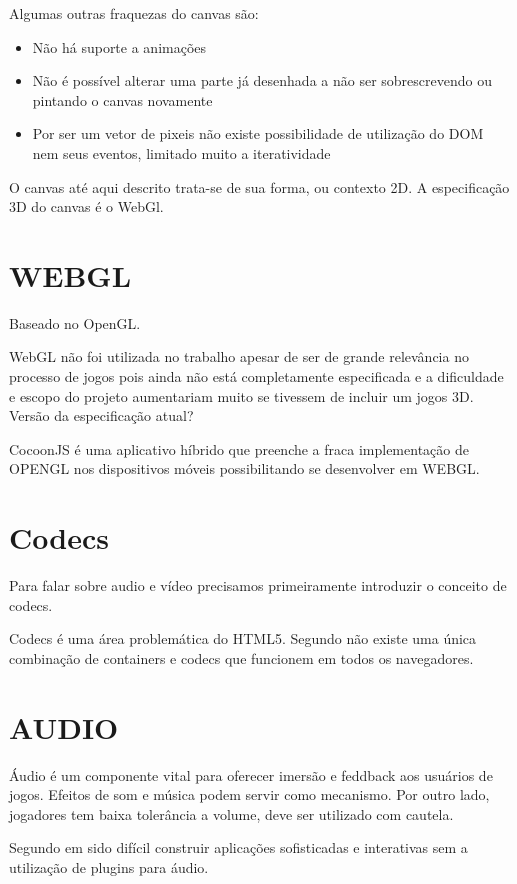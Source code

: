 \documentclass[
12pt,
a4paper,
portuges,
draft
]{report}
\begin{document}
Algumas outras fraquezas do canvas são:
\begin{itemize}
\item{Não há suporte a animações}
\item{Não é possível alterar uma parte já desenhada a não ser sobrescrevendo ou pintando o canvas novamente}
\item{Por ser um vetor de pixeis não existe possibilidade de utilização do DOM nem seus eventos, limitado muito a iteratividade}
\end{itemize}

O canvas até aqui descrito trata-se de sua forma, ou contexto 2D. A
especificação 3D do canvas é o WebGl.


\section{WEBGL}
Baseado no OpenGL.

WebGL não foi utilizada no trabalho apesar de ser de grande
relevância no processo de jogos pois ainda não está completamente
especificada e a dificuldade e escopo do projeto aumentariam muito se
tivessem de incluir um jogos 3D. Versão da especificação atual?

CocoonJS é uma aplicativo híbrido que preenche a fraca implementação
de OPENGL nos dispositivos móveis possibilitando se desenvolver em
WEBGL.
\section{Codecs}

Para falar sobre audio e vídeo precisamos primeiramente introduzir o conceito de codecs.

Codecs é uma área problemática do HTML5. Segundo \cite{diveIntohtml} não existe uma única combinação de containers e codecs que funcionem em todos os navegadores.

\section{AUDIO}
Áudio é um componente vital para oferecer imersão e feddback aos
usuários de jogos. Efeitos de som e música podem servir como mecanismo. 
Por outro lado, jogadores tem baixa tolerância a volume, deve ser utilizado com cautela.

Segundo \cite{browserGamesTechnologyAndFuture} em sido difícil construir aplicações sofisticadas e interativas sem a utilização de plugins para áudio.
\end{document}
